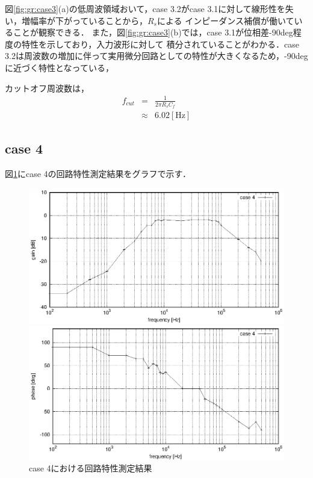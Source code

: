 \documentclass[dvipdfmx,titlepage,a4j]{jsarticle}  %
\begin{document}
図\ref{fig:gr:case3}(a)の低周波領域おいて，case 3.2がcase 3.1に対して線形性を失い，増幅率が下がっていることから，$R_s$による
インピーダンス補償が働いていることが観察できる．
また，図\ref{fig:gr:case3}(b)では，case 3.1が位相差-90deg程度の特性を示しており，入力波形に対して
積分されていることがわかる．case 3.2は周波数の増加に伴って実用微分回路としての特性が大きくなるため，-90degに近づく特性となっている，

カットオフ周波数は，
\begin{eqnarray}
  f_{cut} &=& \frac{1}{2\pi R_s C_f}\\
  &\approx& 6.02 \mathrm{[Hz]}
\end{eqnarray}

\subsection{case 4}
図\ref{fig:gr:case4}にcase 4の回路特性測定結果をグラフで示す．
\begin{figure}[H]
  \centering
  \begin{minipage}{8cm}
    \centering
    \includegraphics[keepaspectratio, scale=0.6]{../data/case4-g.eps}
  \end{minipage}
  \begin{minipage}{8cm}
    \centering
    \includegraphics[keepaspectratio, scale=0.6]{../data/case4-f.eps}
  \end{minipage}
  \caption{case 4における回路特性測定結果}
  \label{fig:gr:case4}
\end{figure}
\end{document}
